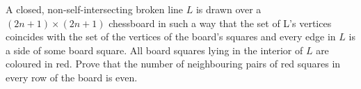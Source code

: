 A closed, non-self-intersecting broken line $L$ is drawn over a $(2n+1) \times (2n+1)$ chessboard in such a way that the set of L's vertices coincides with the set of the vertices of the board’s squares and every edge in $L$ is a side of some board square. All board squares lying in the interior of $L$ are coloured in red. Prove that the number of neighbouring pairs of red squares in every row of the board is even.